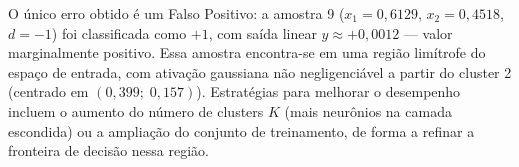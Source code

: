 \documentclass[article, 12pt, oneside, a4paper, section = TITLE, brazil]{abntex2}
\begin{document}
O único erro obtido é um Falso Positivo: a amostra 9 ($x_1 = 0{,}6129$, $x_2 = 0{,}4518$, $d = -1$) foi classificada como $+1$, com saída linear $y \approx +0{,}0012$ — valor marginalmente positivo. Essa amostra encontra-se em uma região limítrofe do espaço de entrada, com ativação gaussiana não negligenciável a partir do cluster 2 (centrado em $(0{,}399;\; 0{,}157)$). Estratégias para melhorar o desempenho incluem o aumento do número de clusters $K$ (mais neurônios na camada escondida) ou a ampliação do conjunto de treinamento, de forma a refinar a fronteira de decisão nessa região.
\end{document}
